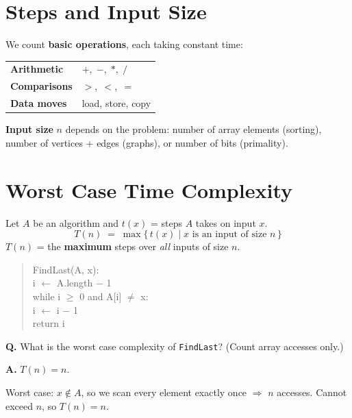 \documentclass[11pt]{article}
\begin{document}
\section{Steps and Input Size}

We count \textbf{basic operations}, each taking constant time:

\begin{center}
\renewcommand{\arraystretch}{1.4}
\begin{tabular}{l l}
\textcolor{heapblue}{\bfseries Arithmetic} & $+,\;-,\;*,\;/$ \\
\textcolor{heapblue}{\bfseries Comparisons} & $>,\;<,\;=$ \\
\textcolor{heapblue}{\bfseries Data moves} & load, store, copy \\
\end{tabular}
\end{center}

\textbf{Input size} $n$ depends on the problem: number of array elements (sorting), number of vertices + edges (graphs), or number of bits (primality).

\section{Worst Case Time Complexity}

\begin{defbox}
Let $A$ be an algorithm and $t(x)$ = steps $A$ takes on input $x$.
\[
  T(n)\;=\;\max\!\big\{\, t(x)\;\big|\; x \text{ is an input of size } n \,\big\}
\]
$T(n)$ = the \textbf{maximum} steps over \emph{all} inputs of size $n$.
\end{defbox}

\begin{exambox}
\begin{quote}\ttfamily
FindLast(A, x):\\
\hspace*{2em} i $\leftarrow$ A.length $-$ 1\\
\hspace*{2em} while i $\ge$ 0 and A[i] $\ne$ x:\\
\hspace*{4em} i $\leftarrow$ i $-$ 1\\
\hspace*{2em} return i
\end{quote}
\textbf{Q.} What is the worst case complexity of \texttt{FindLast}? (Count array accesses only.)

\begin{answerband}
\textbf{A.} $T(n) = n$.

Worst case: $x \notin A$, so we scan every element exactly once $\Rightarrow$ $n$ accesses. Cannot exceed $n$, so $T(n) = n$.
\end{answerband}
\end{exambox}
\end{document}
